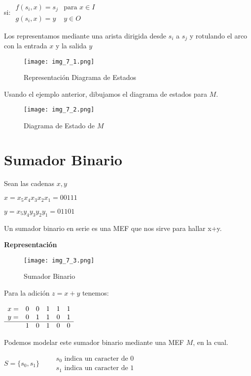 \begin{enumerate}
\begin{itemize}
	si: $\begin{array}{cl}
	f(s_i,x)=s_j	&\mbox{para }x\in I	\\
	g(s_i,x)=y		&y\in O	
	\end{array}$
	\end{itemize}
	Los representamos mediante una arista dirigida desde $s_i$ a $s_j$ y rotulando el arco con la entrada $x$ y la salida $y$
	\begin{figure}[h]
	\centering
	\texttt{[image: img\_7\_1.png]} 
	\caption{Representación Diagrama de Estados}
	\end{figure}
	
	Usando el ejemplo anterior, dibujamos el diagrama de estados para $M$.
	\begin{figure}[h]
	\centering
	\texttt{[image: img\_7\_2.png]} 
	\caption{Diagrama de Estado de $M$}
	\end{figure} 
\end{enumerate}

\section{Sumador Binario}

Sean las cadenas $x,y$

$x=x_5x_4x_3x_2x_1=00111$

$y=x_5y_4y_3y_2y_1=01101$

Un sumador binario en serie es una MEF que nos sirve para hallar x+y.

\textbf{Representación}

\begin{figure}
\centering
\texttt{[image: img\_7\_3.png]} 
\caption{Sumador Binario}
\end{figure}

Para la adición $z=x+y$ tenemos:

$\begin{array}{cccccc}
x=	&0	&0	&1	&1	&1	\\
y=	&0	&1	&1	&0	&1	\\ \hline
	&1	&0	&1	&0	&0
\end{array}$

Podemos modelar este sumador binario mediante una MEF $M$, en la cual.

$S=\{s_0,s_1\}	\qquad \begin{matrix}
s_0 \mbox{ indica un caracter de 0} \\
s_1 \mbox{ indica un caracter de 1}
\end{matrix}$\\

